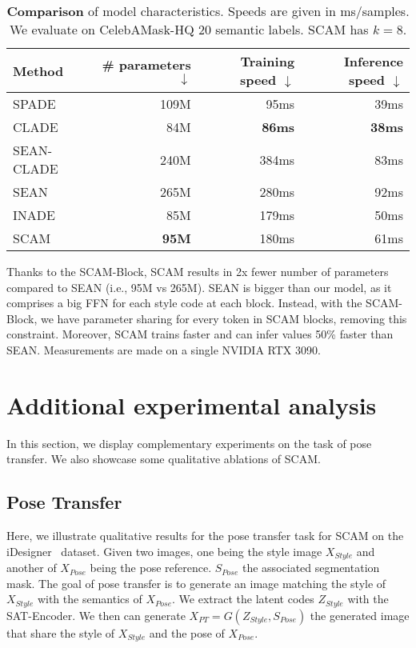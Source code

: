 \documentclass[runningheads]{llncs}
\makeatletter
\newcommand{\mname}{SCAM\@\xspace}
\makeatother
\begin{document}
\begin{table}[t]
\begin{center}
		\begin{small}
\begin{tabular}{lrrr}
\toprule
Method & \# parameters $\downarrow$ & Training speed  $\downarrow$ & Inference speed $\downarrow$ \\
\midrule
SPADE & 109M & 95ms & 39ms\\
CLADE & 84M & \textbf{86ms} & \textbf{38ms} \\
SEAN-CLADE & 240M & 384ms & 83ms \\
SEAN & 265M & 280ms & 92ms \\
INADE & 85M & 179ms & 50ms \\

\mname & \textbf{95M} & 180ms & 61ms \\
\bottomrule
\end{tabular}\end{small}
	\end{center}
	\caption{\small{\textbf{Comparison} of model characteristics. Speeds are given in ms/samples. We evaluate on CelebAMask-HQ\cite{karras2018progressive} 20 semantic labels. \mname has $k=8$.}}
\label{tab:model_tech}
\end{table}


Thanks to the SCAM-Block, \mname results in 2x fewer number of parameters compared to SEAN (i.e., 95M vs 265M). SEAN is bigger than our model, as it comprises a big FFN for each style code at each block. Instead, with the \mname-Block, we have parameter sharing for every token in SCAM blocks, removing this constraint. Moreover, \mname trains faster and can infer values 50\% faster than SEAN. Measurements are made on a single NVIDIA RTX 3090.

\section{Additional experimental analysis}
\label{sup:sub:exps}

In this section, we display complementary experiments on the task of pose transfer. We also showcase some qualitative ablations of \mname.

\subsection{Pose Transfer}

Here, we illustrate qualitative results for the pose transfer task for \mname on the iDesigner~\cite{idesigner} dataset. 
Given two images, one being the style image $X_{Style}$ and another of $X_{Pose}$ being the pose reference. $S_{Pose}$ the associated segmentation mask. The goal of pose transfer is to generate an image matching the style of $X_{Style}$ with the semantics of $X_{Pose}$. We extract the latent codes $Z_{Style}$ with the SAT-Encoder. We then can generate $X_{PT} = G(Z_{Style},S_{Pose})$ the generated image that share the style of $X_{Style}$ and the pose of $X_{Pose}$.
\end{document}
